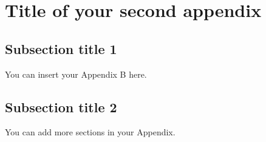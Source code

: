 \chapter{Title of your second appendix}

\section{Subsection title 1} \label{app-b-1}

You can insert your Appendix B here.

\section{Subsection title 2} \label{app-b-2}

You can add more sections in your Appendix.